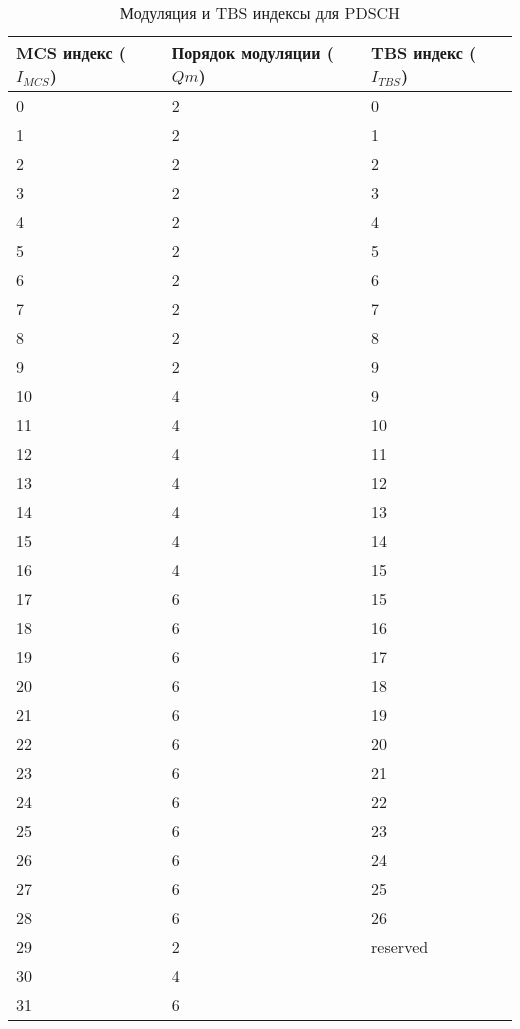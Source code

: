 \begin{table} [htb]
  \centering
\parbox{15cm}{\caption{Модуляция и TBS индексы для PDSCH}\label{TBindex}}
    \begin{tabular}{|l|l|l|}
    \hline
     MCS индекс ($I_{MCS}$) &  Порядок модуляции ($Qm$) &  TBS индекс ($I_{TBS}$)    \\ \hline
    0      & 2    & 0         \\ \hline
    1      & 2    & 1         \\ \hline
    2      & 2    & 2         \\ \hline
    3      & 2    & 3         \\ \hline
    4      & 2    & 4         \\ \hline
    5      & 2    & 5         \\ \hline
    6      & 2    & 6         \\ \hline
    7      & 2    & 7         \\ \hline
    8      & 2    & 8         \\ \hline
    9      & 2    & 9         \\ \hline
    10     & 4    & 9         \\ \hline
    11     & 4    & 10        \\ \hline
    12     & 4    & 11        \\ \hline
    13     & 4    & 12        \\ \hline
    14     & 4    & 13        \\ \hline
    15     & 4    & 14        \\ \hline
    16     & 4    & 15        \\ \hline
    17     & 6    & 15        \\ \hline
    18     & 6    & 16        \\ \hline
    19     & 6    & 17        \\ \hline
    20     & 6    & 18        \\ \hline
    21     & 6    & 19        \\ \hline
    22     & 6    & 20        \\ \hline
    23     & 6    & 21        \\ \hline
    24     & 6    & 22        \\ \hline
    25     & 6    & 23        \\ \hline
    26     & 6    & 24        \\ \hline
    27     & 6    & 25        \\ \hline
    28     & 6    & 26        \\ \hline
    29     & 2    &  reserved \\
    30     & 4    & ~         \\
    31     & 6    & ~         \\ \hline
    \end{tabular}
\end{table}



